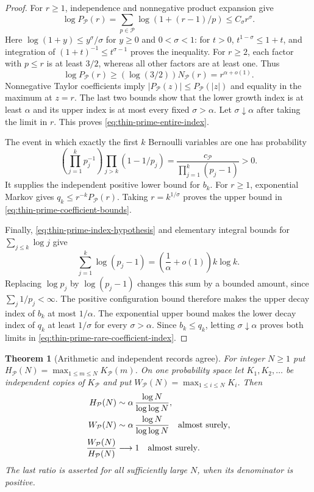 \documentclass[11pt]{article}
\newtheorem{theorem}{Theorem}[section]
\theoremstyle{definition}
\begin{document}
\begin{proof}
For $r\ge1$, independence and nonnegative product expansion give
\[
 \log P_{\mathcal P}(r)
  =\sum_{p\in\mathcal P}
                   \log(1+(r-1)/p)
  \le C_\sigma r^\sigma.
\]
Here $\log(1+y)\le y^\sigma/\sigma$ for $y\ge0$ and
$0<\sigma<1$: for $t>0$,
$t^{1-\sigma}\le1+t$, and integration of
$(1+t)^{-1}\le t^{\sigma-1}$ proves the inequality.
For $r\ge2$, each factor with $p\le r$ is at least $3/2$,
whereas all other factors are at least one.  Thus
\[
 \log P_{\mathcal P}(r)
       \ge(\log(3/2))N_{\mathcal P}(r)
       =r^{\alpha+o(1)}.
\]
Nonnegative Taylor coefficients imply
$|P_{\mathcal P}(z)|\le P_{\mathcal P}(|z|)$ and equality
in the maximum at $z=r$.  The last two bounds show that the
lower growth index is at least $\alpha$ and its upper index
is at most every fixed $\sigma>\alpha$.
Let $\sigma\downarrow\alpha$ after taking the limit in $r$.
This proves \eqref{eq:thin-prime-entire-index}.

The event in which exactly the first $k$ Bernoulli variables
are one has probability
\[
 \left(\prod_{j=1}^kp_j^{-1}\right)
       \prod_{j>k}(1-1/p_j)
       =\frac{c_{\mathcal P}}{\prod_{j=1}^k(p_j-1)}>0.
\]
It supplies the independent positive lower bound for $b_k$.
For $r\ge1$, exponential Markov gives
$q_k\le r^{-k}P_{\mathcal P}(r)$.
Taking $r=k^{1/\sigma}$ proves the upper bound in
\eqref{eq:thin-prime-coefficient-bounds}.

Finally, \eqref{eq:thin-prime-index-hypothesis} and elementary
integral bounds for $\sum_{j\le k}\log j$ give
\[
 \sum_{j=1}^k\log(p_j-1)
       =\left(\frac1\alpha+o(1)\right)k\log k .
\]
Replacing $\log p_j$ by $\log(p_j-1)$ changes this sum by
a bounded amount, since $\sum_j1/p_j<\infty$.
The positive configuration bound therefore makes the upper
decay index of $b_k$ at most $1/\alpha$.
The exponential upper bound makes the lower decay index of
$q_k$ at least $1/\sigma$ for every $\sigma>\alpha$.
Since $b_k\le q_k$, letting $\sigma\downarrow\alpha$ proves
both limits in \eqref{eq:thin-prime-rare-coefficient-index}.
\end{proof}

\begin{theorem}[Arithmetic and independent records agree]
\label{thm:thin-prime-record-duality}
For integer $N\ge1$ put
$H_{\mathcal P}(N)=\max_{1\le m\le N}K_{\mathcal P}(m)$.
On one probability space let $K_1,K_2,\ldots$ be independent
copies of $K_{\mathcal P}$ and put
$W_{\mathcal P}(N)=\max_{1\le i\le N}K_i$.
Then
\begin{equation}
 \begin{aligned}
 H_{\mathcal P}(N)
       &\sim\alpha\,\frac{\log N}{\log\log N},\\
 W_{\mathcal P}(N)
       &\sim\alpha\,\frac{\log N}{\log\log N}
                                      \quad\hbox{almost surely},\\
 \frac{W_{\mathcal P}(N)}{H_{\mathcal P}(N)}
       &\longrightarrow1\quad\hbox{almost surely}.
 \end{aligned}
 \label{eq:thin-prime-record-limits}
\end{equation}
The last ratio is asserted for all sufficiently large $N$,
when its denominator is positive.
\end{theorem}
\end{document}
